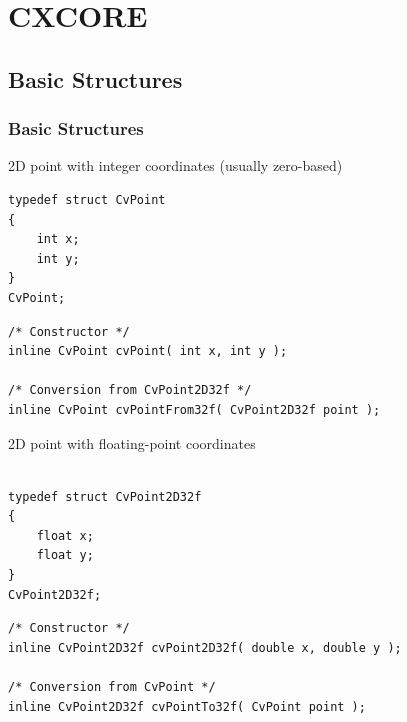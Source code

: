 \chapter{CXCORE}

\section{Basic Structures}

\subsection{Basic Structures}

\label{CvPoint}

2D point with integer coordinates (usually zero-based)

\begin{lstlisting}
typedef struct CvPoint
{
    int x; 
    int y; 
}
CvPoint;
\end{lstlisting}

\begin{description}
\end{description}

\begin{lstlisting}
/* Constructor */
inline CvPoint cvPoint( int x, int y );

/* Conversion from CvPoint2D32f */
inline CvPoint cvPointFrom32f( CvPoint2D32f point );
\end{lstlisting}

\label{CvPoint2D32f}

2D point with floating-point coordinates

\begin{lstlisting}

typedef struct CvPoint2D32f
{
    float x;
    float y; 
}
CvPoint2D32f;
\end{lstlisting}

\begin{description}
\end{description}

\begin{lstlisting}
/* Constructor */
inline CvPoint2D32f cvPoint2D32f( double x, double y );

/* Conversion from CvPoint */
inline CvPoint2D32f cvPointTo32f( CvPoint point );

\end{lstlisting}


